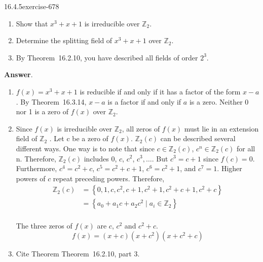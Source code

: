 \documentclass[twoside,10pt,]{book}
\numberwithin{equation}{section}
\begin{document}
\begin{divisionsolution}{16.4.5}{}{exercise-678}%
\hypertarget{p-6047}{}%
\leavevmode%
\begin{enumerate}[label=(\alph*)]
\item\hypertarget{li-2675}{}\hypertarget{p-6048}{}%
Show that \(x^3+ x + 1\) is irreducible over \(\mathbb{Z}_2\).%
\item\hypertarget{li-2676}{}\hypertarget{p-6049}{}%
Determine the splitting field of \(x^3+ x + 1\) over \(\mathbb{Z}_2\).%
\item\hypertarget{li-2677}{}\hypertarget{p-6050}{}%
By Theorem~16.2.10, you have described all fields of order \(2^3\).%
\end{enumerate}
%
\par\smallskip%
\noindent\textbf{Answer}.\quad%
\hypertarget{p-6051}{}%
\leavevmode%
\begin{enumerate}[label=(\alph*)]
\item\hypertarget{li-2678}{}\hypertarget{p-6052}{}%
\(f(x) = x^3 + x + 1\) is reducible if and only if it has a factor of the form \(x- a\). By Theorem~16.3.14, \(x-a\) is a factor if and only if \(a\) is a zero. Neither 0 nor 1 is a zero of \(f(x)\) over \(\mathbb{Z}_2\).%
\item\hypertarget{li-2679}{}\hypertarget{p-6053}{}%
Since \(f(x)\) is irreducible over \(\mathbb{Z}_2\), all zeros of \(f(x)\) must lie in an extension field of \(\mathbb{Z}_2\) . Let c be a zero of \(f(x)\).   \(\mathbb{Z}_2(c)\) can be described several different ways.  One way is to note that since \(c \in  \mathbb{Z}_2(c)\), \(c^n\in
\mathbb{Z}_2(c)\) for all n.  Therefore, \(\mathbb{Z}_2(c)\) includes 0, \(c\), \(c^2\), \(c^3, \ldots\). But \(c^3 = c + 1\) since \(f(c) = 0\). Furthermore, \(c^4 = c^2+ c\), \(c^5= c^2+ c +1\), \(c^6= c^2+1\), and \(c^7=1\).  Higher powers of \(c\) repeat preceding powers.  Therefore,%
\begin{equation*}
\begin{split}
\mathbb{Z}_2(c)&= \left\{0, 1, c, c^2 , c + 1, c^2 + 1, c^2 + c + 1, c ^2 + c\right\}\\
&= \left\{a_0+ a_1c+a_2c^2 \mid  a_i\in \mathbb{Z}_2\right\}\\
\end{split}
\end{equation*}
%
\par
\hypertarget{p-6054}{}%
The three zeros of \(f(x)\) are \(c\),  \(c^2\) and \(c^2+ c\).%
\begin{equation*}
f(x) = (x + c)\left(x+ c ^2 \right)\left(x + c^2 + c\right)
\end{equation*}
%
\item\hypertarget{li-2680}{}\hypertarget{p-6055}{}%
Cite Theorem Theorem~16.2.10, part 3.%
\end{enumerate}
%
\end{divisionsolution}%
\end{document}
